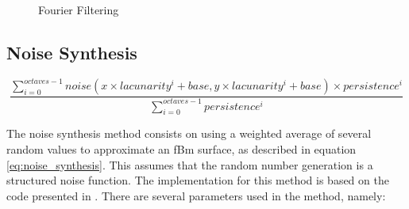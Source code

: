     
    \begin{figure}[!h]
    	\begin{center}
    	\end{center}
    	\caption{Fourier Filtering}
    	\label{fig:fourier_filtering}
    \end{figure}		
  
  \subsection{Noise Synthesis} \label{sec:methodology:noise}
  
	\begin{equation}
		\frac{\sum\limits_{i = 0}^{octaves - 1} noise(x \times lacunarity^i + base, y \times lacunarity^i + base) \times persistence^i}{ \sum\limits_{i = 0}^{octaves - 1} persistence^i}
		\label{eq:noise_synthesis}
	\end{equation}
  
    The noise synthesis method consists on using a weighted average of several random values to approximate an fBm surface, as described in equation \ref{eq:noise_synthesis}. This assumes that the random number generation is a structured noise function. The implementation for this method is based on the code presented in \cite{Musgrave1993}. There are several parameters used in the method, namely:
    
